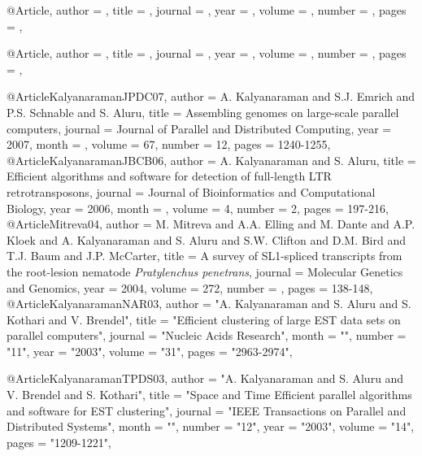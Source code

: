 @Article{,
  author = {},
  title =  {},
  journal = {},
  year = {},
  volume =  {},
  number =  {},
  pages =   {},
}

@Article{,
  author = {},
  title =  {},
  journal = {},
  year = {},
  volume =  {},
  number =  {},
  pages =   {},
}

@Article{KalyanaramanJPDC07,
  author =       {A. Kalyanaraman and S.J. Emrich and P.S. Schnable and S. Aluru},
  title =        {Assembling genomes on large-scale parallel computers},
  journal = {Journal of Parallel and Distributed Computing},
  year = {2007},
  month = {},
  volume =  {67},
  number =  {12},
  pages =   {1240-1255},
}
@Article{KalyanaramanJBCB06,
  author =  {A. Kalyanaraman and S. Aluru},
  title = {{Efficient algorithms and software for detection of full-length LTR retrotransposons}},
  journal = {Journal of Bioinformatics and Computational Biology},
  year = {2006},
  month = {},
  volume =  {4},
  number =  {2},
  pages =   {197-216},
}
@Article{Mitreva04,
  author = {M. Mitreva and A.A. Elling and M. Dante and A.P. Kloek and A. Kalyanaraman and S. Aluru and S.W. Clifton and D.M. Bird and T.J. Baum and J.P. McCarter},
  title =  {{A survey of SL1-spliced transcripts from the root-lesion nematode {\it Pratylenchus penetrans}}},
  journal = {Molecular Genetics and Genomics},
  year = {2004},
  volume =  {272},
  number =  {},
  pages =   {138-148},
}
@Article{KalyanaramanNAR03,
   author =   "A. Kalyanaraman and S. Aluru and S. Kothari and V. Brendel",
   title =   "Efficient clustering of large \uppercase{EST} data sets on parallel computers",
   journal =   "Nucleic Acids Research",
   month = "",
   number = "11",
   year =   "2003",
   volume =   "31",
   pages =   "2963-2974",
}

@Article{KalyanaramanTPDS03,
   author =   "A. Kalyanaraman and S. Aluru and V. Brendel and S. Kothari",
   title =   "Space and Time Efficient parallel algorithms and software for \uppercase{EST} clustering",
   journal =   "IEEE Transactions on Parallel and Distributed Systems",
   month = "",
   number = "12",
   year =   "2003",
   volume =   "14",
   pages =   "1209-1221",
}



